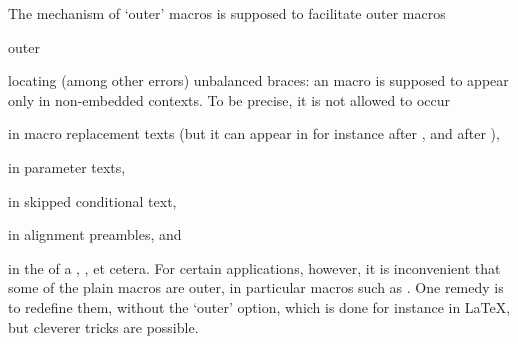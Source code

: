 \item {}
The mechanism of `outer' macros is supposed to facilitate
\term outer macros\par\csterm outer\par
locating (among other errors) unbalanced braces: an 
macro is supposed
to  appear only in non-embedded contexts.
To be precise, it is not allowed to occur 
\itemlist
\item in macro replacement texts (but it can appear in
    for instance  after 
    , and after ),
\item in parameter texts,
\item in skipped conditional text,
\item in alignment preambles, and
\item in the  of a , ,
et cetera. \itemliststop
For certain applications, however, it is inconvenient
that some of the plain macros  are outer, 
in particular macros such as . One remedy is to
redefine them, without the `outer' option, which
is done for instance in \LaTeX, but  cleverer tricks are possible.

